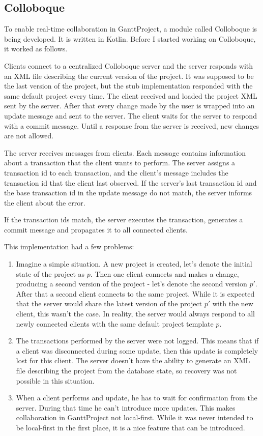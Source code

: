 \documentclass[a4paper, 11pt, oneside]{article}
\theoremstyle{definition}
\begin{document}
\subsection{Colloboque}
To enable real-time collaboration in GanttProject, a module called Colloboque is being developed. It is written in Kotlin. Before I started working on Colloboque, it worked as follows.

Clients connect to a centralized Colloboque server and the server responds with an XML file describing the current version of the project. It was supposed to be the last version of the project, but the stub implementation responded with the same default project every time. The client received and loaded the project XML sent by the server. After that every change made by the user is wrapped into an update message and sent to the server. The client waits for the server to respond with a commit message. Until a response from the server is received, new changes are not allowed. 

The server receives messages from clients. Each message contains information about a transaction that the client wants to perform. The server assigns a transaction id to each transaction, and the client's message includes the transaction id that the client last observed. If the server's last transaction id and the base transaction id in the update message do not match, the server informs the client about the error.

If the transaction ids match, the server executes the transaction, generates a commit message and propagates it to all connected clients.

This implementation had a few problems:

\begin{enumerate}
    \item Imagine a simple situation. A new project is created, let's denote the initial state of the project as $p$. Then one client connects and makes a change, producing a second version of the project - let's denote the second version $p'$. After that a second client connects to the same project. While it is expected that the server would share the latest version of the project $p'$ with the new client, this wasn't the case. In reality, the server would always respond to all newly connected clients with the same default project template $p$.
    \item The transactions performed by the server were not logged. This means that if a client was disconnected during some update, then this update is completely lost for this client. The server doesn't have the ability to generate an XML file describing the project from the database state, so recovery was not possible in this situation.
    \item When a client performs and update, he has to wait for confirmation from the server. During that time he can't introduce more updates. This makes collaboration in GanttProject not local-first. While it was never intended to be local-first in the first place, it is a nice feature that can be introduced.
\end{enumerate}
\end{document}
